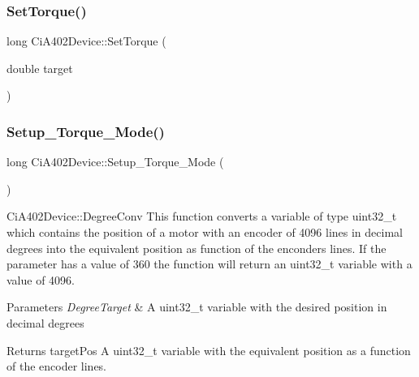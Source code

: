 \mbox{\label{classCiA402Device_a556c03984774974dd3a1231793916d9b}} 
\subsubsection{\texorpdfstring{Set\+Torque()}{SetTorque()}}
{\footnotesize\ttfamily long Ci\+A402\+Device\+::\+Set\+Torque (\begin{DoxyParamCaption}\item[{double}]{target }\end{DoxyParamCaption})}

\mbox{\label{classCiA402Device_a20475438205c26cd4bcc689ed9c7fe95}} 
\subsubsection{\texorpdfstring{Setup\+\_\+\+Torque\+\_\+\+Mode()}{Setup\_Torque\_Mode()}}
{\footnotesize\ttfamily long Ci\+A402\+Device\+::\+Setup\+\_\+\+Torque\+\_\+\+Mode (\begin{DoxyParamCaption}{ }\end{DoxyParamCaption})}



Ci\+A402\+Device\+::\+Degree\+Conv This function converts a variable of type uint32\+\_\+t which contains the position of a motor with an encoder of 4096 lines in decimal degrees into the equivalent position as function of the enconders lines. If the parameter has a value of 360 the function will return an uint32\+\_\+t variable with a value of 4096. 


\begin{DoxyParams}{Parameters}
{\em Degree\+Target} & A uint32\+\_\+t variable with the desired position in decimal degrees \\
\hline
\end{DoxyParams}
\begin{DoxyReturn}{Returns}
target\+Pos A uint32\+\_\+t variable with the equivalent position as a function of the encoder lines. 
\end{DoxyReturn}
\mbox{\label{classCiA402Device_ac1db22a6a8a7d7a56590423bd7577c7b}} 
